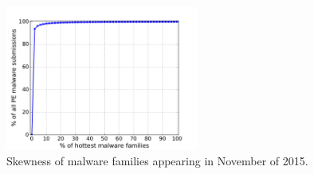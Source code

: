 \begin{figure}[t!]
\begin{center}
\includegraphics[width=2.5in]{figure/cum}
\caption{Skewness of malware families appearing in November of 2015.}
\label{fig:acum}
\end{center}
\end{figure}

